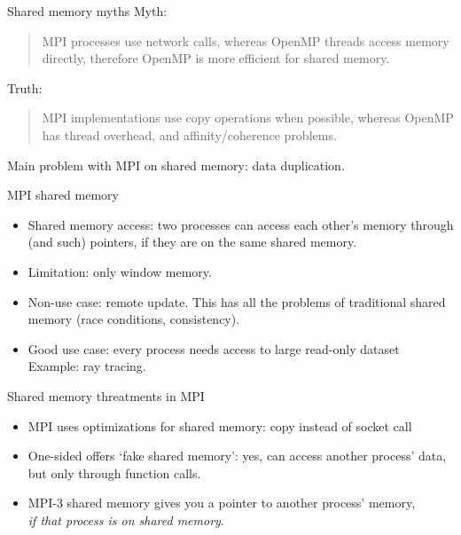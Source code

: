 
\begin{numberedframe}{Shared memory myths}
  Myth:
  \begin{quote}
    MPI processes use network calls, whereas OpenMP threads access memory directly,
    therefore OpenMP is more efficient for shared memory.
  \end{quote}
  Truth:
  \begin{quote}
    MPI implementations use copy operations when possible, whereas OpenMP
    has thread overhead, and affinity/coherence problems.
  \end{quote}
  Main problem with MPI on shared memory: data duplication.
\end{numberedframe}

\begin{numberedframe}{MPI shared memory}
  \begin{itemize}
  \item Shared memory access: two processes can access each other's
    memory through  (and such) pointers, if they are
    on the same shared memory.
  \item Limitation: only window memory.
  \item Non-use case: remote update. This has all the problems of
    traditional shared memory (race conditions, consistency).
  \item Good use case: every process needs access to large read-only
    dataset\\ Example: ray tracing.
  \end{itemize}
\end{numberedframe}

\begin{numberedframe}{Shared memory threatments in MPI}
  \begin{itemize}
  \item MPI uses optimizations for shared memory: copy instead of
    socket call
  \item One-sided offers `fake shared memory': yes, can access another
    process' data, but only through function calls.
  \item MPI-3 shared memory gives you a pointer to another process'
    memory,\\
    \emph{if that process is on shared memory}.
  \end{itemize}
\end{numberedframe}

